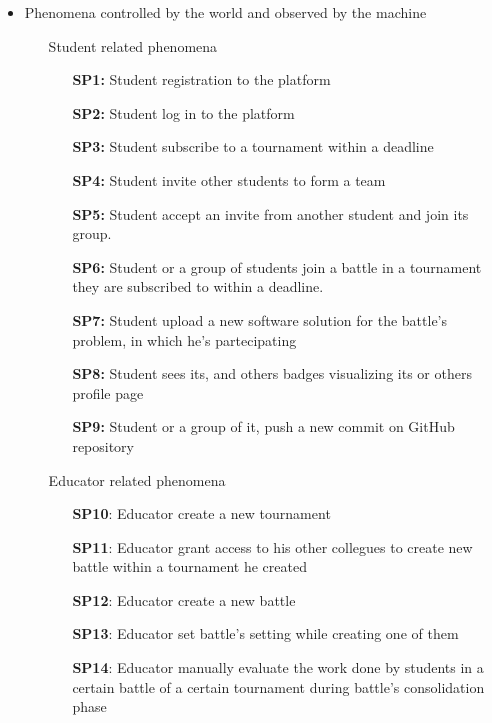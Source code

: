 \documentclass{article}
\newcounter{subsubsubsection}[subsubsection]
\begin{document}
        \begin{itemize}
            \item Phenomena controlled by the world and observed by the machine
            \begin{enumerate}
                \item[\ding{228}] Student related phenomena 
                \begin{enumerate}
                    \item[\textbf{SP1:}] Student registration to the platform
                    \item[\textbf{SP2:}] Student log in to the platform
                    \item[\textbf{SP3:}] Student subscribe to a tournament within a deadline
                    \item[\textbf{SP4:}] Student invite other students to form a team
                    \item[\textbf{SP5:}] Student accept an invite from another student and join its group.
                    \item[\textbf{SP6:}] Student or a group of students join a battle in a tournament they are subscribed to within a deadline.
                    \item[\textbf{SP7:}] Student upload a new software solution for the battle's problem, in which he's partecipating
                    \item[\textbf{SP8:}] Student sees its, and others badges visualizing its or others profile page
                    \item[\textbf{SP9:}] Student or a group of it, push a new commit on GitHub repository
                \end{enumerate}
                \item[\ding{228}] Educator related phenomena
                \begin{enumerate}
                    \item[\textbf{SP10}:] Educator create a new tournament
                    \item[\textbf{SP11}:] Educator grant access to his other collegues to create new battle within a tournament he created
                    \item[\textbf{SP12}:] Educator create a new battle
                    \item[\textbf{SP13}:] Educator set battle's setting while creating one of them
                    \item[\textbf{SP14}:] Educator manually evaluate the work done by students in a certain battle of a certain tournament during battle's consolidation phase

\end{enumerate}
\end{enumerate}
\end{itemize}
\end{document}
